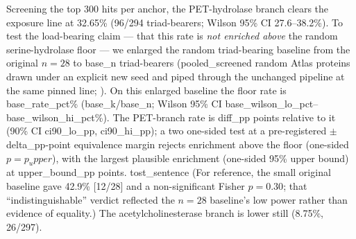 
Screening the top 300 hits per anchor, the PET-hydrolase branch clears the exposure
line at 32.65\% (96/294 triad-bearers; Wilson 95\% CI 27.6--38.2\%). To test the
load-bearing claim --- that this rate is \emph{not enriched above} the random
serine-hydrolase floor --- we enlarged the random triad-bearing baseline from the
original $n=28$ to {{base_n}} triad-bearers ({{pooled_screened}} random Atlas
proteins drawn under an explicit new seed and piped through the unchanged pipeline at
the same pinned line; ). On this enlarged baseline the floor
rate is {{base_rate_pct}}\% ({{base_k}}/{{base_n}}; Wilson 95\% CI
{{base_wilson_lo_pct}}--{{base_wilson_hi_pct}}\%). The PET-branch rate is
{{diff_pp}} points relative to it (90\% CI {{ci90_lo_pp}}, {{ci90_hi_pp}}); a two
one-sided test at a pre-registered $\pm${{delta_pp}}-point equivalence margin
rejects enrichment above the floor (one-sided $p={{p_upper}}$), with the largest
plausible enrichment (one-sided 95\% upper bound) at {{upper_bound_pp}} points.
{{tost_sentence}} (For reference, the small original baseline gave 42.9\% [12/28] and
a non-significant Fisher $p=0.30$; that ``indistinguishable'' verdict reflected the
$n=28$ baseline's low power rather than evidence of equality.) The
acetylcholinesterase branch is lower still (8.75\%, 26/297).


